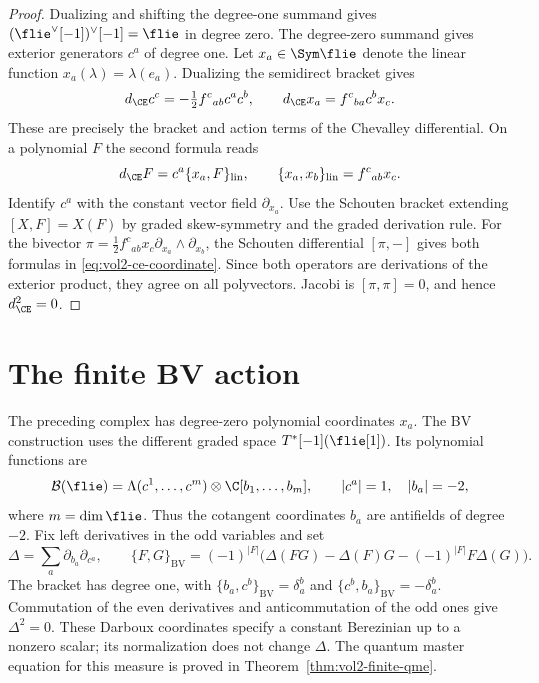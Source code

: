 \begin{proof}
Dualizing and shifting the degree-one summand gives
$(\flie^\vee[-1])^\vee[-1]=\flie$ in degree zero.
The degree-zero summand gives exterior generators $c^a$ of degree one.
Let $x_a\in\Sym\flie$ denote the linear function
$x_a(\lambda)=\lambda(e_a)$. Dualizing the semidirect bracket gives
\begin{equation}\label{eq:vol2-ce-coordinate}
 d_{\CE}c^c=-\tfrac12 f^c{}_{ab}c^ac^b,
 \qquad d_{\CE}x_a=f^c{}_{ba}c^b x_c.
\end{equation}
These are precisely the bracket and action terms of the Chevalley
differential. On a polynomial $F$ the second formula reads
\[
 d_{\CE}F=c^a\{x_a,F\}_{\mathrm{lin}},
 \qquad \{x_a,x_b\}_{\mathrm{lin}}=f^c{}_{ab}x_c.
\]
Identify $c^a$ with the constant vector field $\partial_{x_a}$.
Use the Schouten bracket extending $[X,F]=X(F)$ by graded
skew-symmetry and the graded derivation rule.
For the bivector
$\pi=\tfrac12 f^c{}_{ab}x_c\partial_{x_a}\wedge\partial_{x_b}$,
the Schouten differential $[\pi,-]$ gives both formulas in
\eqref{eq:vol2-ce-coordinate}. Since both operators are derivations
of the exterior product, they agree on all polyvectors. Jacobi is
$[\pi,\pi]=0$, and hence $d_{\CE}^2=0$.
\end{proof}

\section{The finite BV action}

The preceding complex has degree-zero polynomial coordinates $x_a$.
The BV construction uses the different graded space
$T^*[-1](\flie[1])$. Its polynomial functions are
\[
 \mathcal B(\flie)=\Lambda(c^1,\ldots,c^m)
                  \otimes\C[b_1,\ldots,b_m],
 \qquad |c^a|=1,\quad |b_a|=-2,
\]
where $m=\dim\flie$. Thus the cotangent coordinates $b_a$ are
antifields of degree $-2$. Fix left derivatives in the odd variables
and set
\begin{equation}\label{eq:vol2-bv-conventions}
 \Delta=\sum_a\partial_{b_a}\partial_{c^a},\qquad
 \{F,G\}_{\mathrm{BV}}
 =(-1)^{|F|}\bigl(\Delta(FG)-\Delta(F)G
                    -(-1)^{|F|}F\Delta(G)\bigr).
\end{equation}
The bracket has degree one, with
$\{b_a,c^b\}_{\mathrm{BV}}=\delta_a^b$ and
$\{c^b,b_a\}_{\mathrm{BV}}=-\delta_a^b$.
Commutation of the even derivatives and anticommutation of the odd
ones give $\Delta^2=0$.
These Darboux coordinates specify a constant Berezinian up to a
nonzero scalar; its normalization does not change $\Delta$.
The quantum master equation for this measure is proved in
Theorem~\ref{thm:vol2-finite-qme}.

